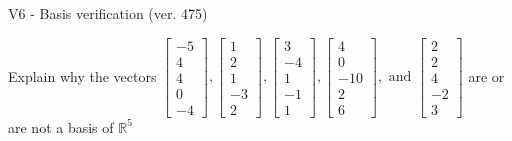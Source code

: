 \begin{exercise}
  \begin{exerciseTitle}V6 - Basis verification (ver. 475)\end{exerciseTitle}
  \begin{exerciseStatement}
    Explain why the vectors \(\left[\begin{array}{r}
-5 \\
4 \\
4 \\
0 \\
-4
\end{array}\right] , \left[\begin{array}{r}
1 \\
2 \\
1 \\
-3 \\
2
\end{array}\right] , \left[\begin{array}{r}
3 \\
-4 \\
1 \\
-1 \\
1
\end{array}\right] , \left[\begin{array}{r}
4 \\
0 \\
-10 \\
2 \\
6
\end{array}\right] , \text{ and } \left[\begin{array}{r}
2 \\
2 \\
4 \\
-2 \\
3
\end{array}\right]\) are or are not a basis of \(\mathbb{R}^5\)	



\end{exerciseStatement}
\end{exercise}
